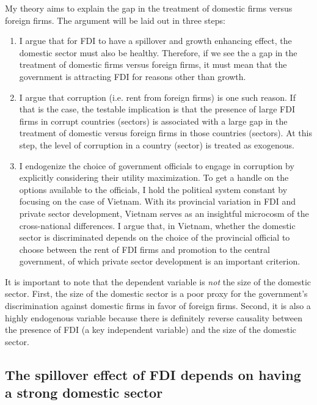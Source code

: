 My theory aims to explain the gap in the treatment of domestic firms versus foreign firms. The argument will be laid out in three steps:

\begin{enumerate}
\item I argue that for FDI to have a spillover and growth enhancing effect, the domestic sector must also be healthy. Therefore, if we see the a gap in the treatment of domestic firms versus foreign firms, it must mean that the government is attracting FDI for reasons other than growth.
\item I argue that corruption (i.e. rent from foreign firms) is one such reason. If that is the case, the testable implication is that the presence of large FDI firms in corrupt countries (sectors) is associated with a large gap in the treatment of domestic versus foreign firms in those countries (sectors). At this step, the level of corruption in a country (sector) is treated as exogenous.

\item I endogenize the choice of government officials to engage in corruption by explicitly considering their utility maximization. To get a handle on the options available to the officials, I hold the political system constant by focusing on the case of Vietnam. With its provincial variation in FDI and private sector development, Vietnam serves as an insightful microcosm of the cross-national differences. I argue that, in Vietnam, whether the domestic sector is discriminated depends on the choice of the provincial official to choose between the rent of FDI firms and promotion to the central government, of which private sector development is an important criterion. 
\end{enumerate}

It is important to note that the dependent variable is \textit{not} the size of the domestic sector. First, the size of the domestic sector is a poor proxy for the government's discrimination against domestic firms in favor of foreign firms. Second, it is also a highly endogenous variable because there is definitely reverse causality between the presence of FDI (a key independent variable) and the size of the domestic sector.

\subsection{The spillover effect of FDI depends on having a strong domestic sector}

